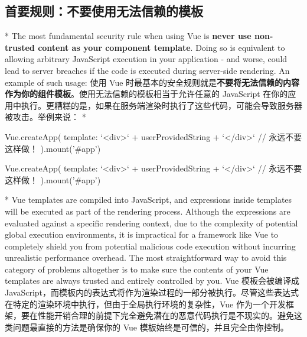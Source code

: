\begin{paracol}{2}
\subsection{首要规则：不要使用无法信赖的模板}
\switchcolumn[0]*%
The most fundamental security rule when using Vue is \textbf{never use
non-trusted content as your component template}. Doing so is equivalent
to allowing arbitrary JavaScript execution in your application - and
worse, could lead to server breaches if the code is executed during
server-side rendering. An example of such usage:
\switchcolumn
使用 Vue
时最基本的安全规则就是\textbf{不要将无法信赖的内容作为你的组件模板}。使用无法信赖的模板相当于允许任意的
JavaScript
在你的应用中执行。更糟糕的是，如果在服务端渲染时执行了这些代码，可能会导致服务器被攻击。举例来说：
\switchcolumn[0]*%
\begin{codeJs}
Vue.createApp({
  template: `<div>` + userProvidedString + `</div>` // 永远不要这样做！
}).mount('#app')
\end{codeJs}
\switchcolumn
\begin{codeJs}
Vue.createApp({
  template: `<div>` + userProvidedString + `</div>` // 永远不要这样做！
}).mount('#app')
\end{codeJs}
\switchcolumn[0]*%
Vue templates are compiled into JavaScript, and expressions inside
templates will be executed as part of the rendering process. Although
the expressions are evaluated against a specific rendering context, due
to the complexity of potential global execution environments, it is
impractical for a framework like Vue to completely shield you from
potential malicious code execution without incurring unrealistic
performance overhead. The most straightforward way to avoid this
category of problems altogether is to make sure the contents of your Vue
templates are always trusted and entirely controlled by you.
\switchcolumn
Vue 模板会被编译成
JavaScript，而模板内的表达式将作为渲染过程的一部分被执行。尽管这些表达式在特定的渲染环境中执行，但由于全局执行环境的复杂性，Vue
作为一个开发框架，要在性能开销合理的前提下完全避免潜在的恶意代码执行是不现实的。避免这类问题最直接的方法是确保你的
Vue 模板始终是可信的，并且完全由你控制。
\end{paracol}



